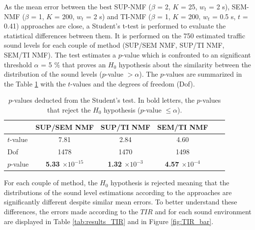 \documentclass[twocolumn]{svjour3}          %
\begin{document}
As the mean error between the best SUP-NMF ($\beta$ = 2, $K$ = 25, $w_t$ = 2 s), SEM-NMF ($\beta$ = 1, $K$ = 200, $w_t$ = 2 s) and TI-NMF ($\beta$ = 1, $K$ = 200, $w_t$ = 0.5 s, $t$ = 0.41) approaches are close, a Student's t-test is performed to evaluate the statistical differences between them. It is performed on the 750 estimated traffic sound levels for each couple of method (SUP/SEM NMF, SUP/TI NMF, SEM/TI NMF). The test estimates a $p$-value which is confronted to an significant threshold $\alpha$ = 5 $\%$ that proves an $H_0$ hypothesis about the similarity between the distribution of the sound levels ($p$-value $> \alpha$). The $p$-values are summarized in the Table \ref{tab:student_test} with the $t$-values and the degrees of freedom (Dof).

\begin{table}[t]
\centering
\begin{tabular}{lccccc}
\toprule
  & SUP/SEM NMF & SUP/TI NMF & SEM/TI NMF \\
\midrule
$t$-value & 7.81 & 2.84 & 4.60\\
Dof & 1478 & 1470 & 1498\\
$p$-value & \textbf{5.33 $\times 10^{-15}$} & \textbf{1.32 $\times 10^{-3}$} & \textbf{4.57 $\times 10^{-4}$} \\
\bottomrule
\end{tabular}
\caption{$p$-values deducted from the Student's test. In bold letters, the $p$-values that reject the $H_0$ hypothesis ($p$-value $\leq \alpha$).}
\label{tab:student_test}
\end{table}

For each couple of method, the $H_0$ hypothesis is rejected meaning that the distributions of the sound level estimations according to the approaches are significantly different despite similar mean errors. 
To better understand these differences, the errors made according to the $TIR$ and for each sound environment are displayed in Table \ref{tab:results_TIR} and in Figure \ref{fig:TIR_bar}.
\end{document}
